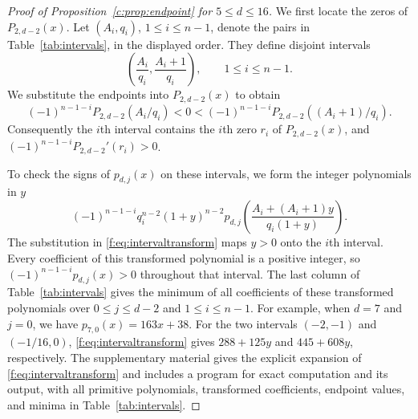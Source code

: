 \documentclass[10pt,a4paper]{article}
\numberwithin{equation}{section}
\theoremstyle{remark}\newtheorem{remark}[theorem]{Remark}
\begin{document}
\begin{proof}[Proof of Proposition~\ref{c:prop:endpoint} for $5\le d\le16$]
We first locate the zeros of $P_{2,d-2}(x)$. Let $(A_i,q_i)$,
$1\le i\le n-1$, denote the pairs in Table~\ref{tab:intervals},
in the displayed order. They define disjoint intervals
\[
 \left(\frac{A_i}{q_i},\frac{A_i+1}{q_i}\right),
 \qquad 1\le i\le n-1.
\]
We substitute the endpoints into $P_{2,d-2}(x)$ to obtain
\begin{equation*}
 (-1)^{n-1-i}P_{2,d-2}(A_i/q_i)<0<
 (-1)^{n-1-i}P_{2,d-2}((A_i+1)/q_i).
\end{equation*}
Consequently the $i$th interval contains the $i$th zero $r_i$ of $P_{2,d-2}(x)$, and
$(-1)^{n-1-i}P_{2,d-2}'(r_i)>0$.

To check the signs of $p_{d,j}(x)$ on these intervals, we form the integer polynomials in $y$
\begin{equation}\label{f:eq:intervaltransform}
 (-1)^{n-1-i} q_i^{n-2}(1+y)^{n-2}
 p_{d,j}\!\left(\frac{A_i+(A_i+1)y}{q_i(1+y)}\right).
\end{equation}
The substitution in \eqref{f:eq:intervaltransform} maps $y>0$ onto
the $i$th interval. Every coefficient of this transformed polynomial is a positive
integer, so $(-1)^{n-1-i}p_{d,j}(x)>0$ throughout that interval.
The last column of Table~\ref{tab:intervals} gives the minimum of all
coefficients of these transformed polynomials over $0\le j\le d-2$ and $1\le i\le n-1$.
For example, when $d=7$ and $j=0$, we have $p_{7,0}(x)=163x+38$.
For the two intervals $(-2,-1)$ and $(-1/16,0)$,
\eqref{f:eq:intervaltransform} gives $288+125y$ and $445+608y$,
respectively. The supplementary material gives the explicit expansion of
\eqref{f:eq:intervaltransform} and includes a program for exact computation
and its output, with all primitive polynomials, transformed coefficients,
endpoint values, and minima in Table~\ref{tab:intervals}.


\end{proof}
\end{document}
